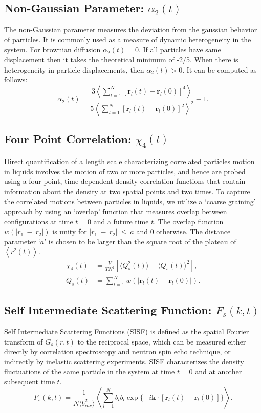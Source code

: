 \documentclass{article}
\begin{document}
\subsection{Non-Gaussian Parameter: $\alpha_2(t)$} \label{sec::alpha2}
The non-Gaussian parameter measures the deviation from the gaussian behavior of particles. It is commonly used as a measure of dynamic heterogeneity in the system. For brownian diffusion $\alpha_2(t) = 0$. If all particles have same displacement then it takes the theoretical minimum of -2/5. When there is heterogeneity in particle displacements, then $\alpha_2(t) > 0$. It can be computed as follows:
\begin{equation}
\alpha_2(t) = \frac{3\left\langle\sum\limits_{l=1}^N[\mathbf{r}_l(t) - \mathbf{r}_l(0)]^4\right\rangle}{5\left\langle\sum\limits_{l=1}^N[\mathbf{r}_l(t) - \mathbf{r}_l(0)]^2\right\rangle^2} - 1.
\end{equation}
 
 \subsection{Four Point Correlation: $\chi_4(t)$} \label{sec::chi4}
Direct quantification of a length scale characterizing correlated particles motion in liquids involves the motion of two or more particles, and hence are probed using a four-point, time-dependent density correlation functions that contain information about the density at two spatial points and two times. To capture the correlated motions between particles in liquids, we utilize a `coarse graining' approach by using an `overlap' function that measures overlap between configurations at time $t=0$ and a future time $t$.  The overlap function $w(|r_1~-~r_2|)$ is unity for $|r_1~-~r_2|~\leq~a$ and 0 otherwise. The distance parameter `$a$' is chosen to be larger than the square root of the plateau of $\left<r^2(t)\right>$.
\begin{equation}
\begin{split}
\chi_4(t) &= \frac{V}{TN^2}[\langle Q_s^2(t)\rangle - \langle Q_s(t)\rangle^2],\\
Q_s(t) &= \sum_{l=1}^N \textit{w}(|\mathbf{r}_l(t) - \mathbf{r}_l(0)|).
\end{split}
\end{equation}

\subsection{Self Intermediate Scattering Function: $F_s(k,t)$} \label{sec::Fsqt}
Self Intermediate Scattering Functions (SISF) is defined as the spatial Fourier transform of $G_s(r,t)$ to the reciprocal space, which can be measured either directly by correlation spectroscopy and neutron spin echo technique, or indirectly by inelastic scattering experiments. SISF characterizes the density fluctuations of the same particle in the system at time $t = 0$ and at another subsequent time $t$.
\begin{equation}
\label{eq:fsqt}
F_s(k,t) = \frac{1}{N\langle b_{inc}^2\rangle} \left\langle \sum_{l=1}^{N} b_lb_l\exp{\{-i\mathbf{k}\cdot[\mathbf{r}_l(t) - \mathbf{r}_l(0)]}\}\right\rangle.
\end{equation}
\end{document}
